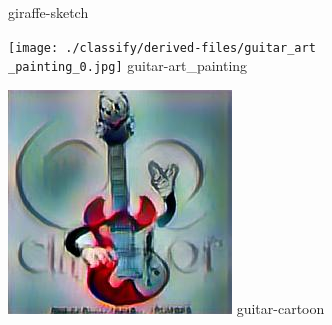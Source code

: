 \documentclass{article}
\begin{document}
\begin{figure}[htp]
\begin{minipage}{0.14285714285714285\linewidth}
        {giraffe-sketch}
    \end{minipage}%
    \begin{minipage}{0.14285714285714285\linewidth}
        \texttt{[image: ./classify/derived-files/guitar\_art\\\_painting\_0.jpg]}
        {guitar-art\_painting}
    \end{minipage}%
    \begin{minipage}{0.14285714285714285\linewidth}
        \includegraphics[width=\linewidth]{./classify/derived-files/guitar_cartoon_0.jpg}
        {guitar-cartoon}
    \end{minipage}%


\end{figure}
\end{document}

